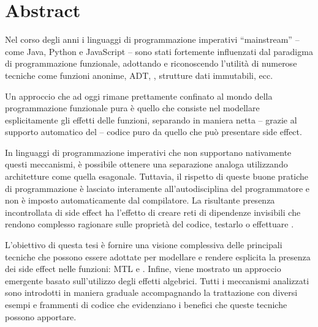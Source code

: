 \chapter*{Abstract}

Nel corso degli anni i linguaggi di programmazione imperativi ``mainstream'' -- come Java, Python e JavaScript -- sono stati fortemente influenzati dal paradigma di programmazione funzionale, adottando e riconoscendo l'utilità di numerose tecniche come funzioni anonime, \ac{ADT}, , strutture dati immutabili, ecc.

Un approccio che ad oggi rimane prettamente confinato al mondo della programmazione funzionale pura è quello che consiste nel modellare esplicitamente gli effetti delle funzioni, separando in maniera netta -- grazie al supporto automatico del  -- codice puro da quello che può presentare side effect.

In linguaggi di programmazione imperativi che non supportano nativamente questi meccanismi, è possibile ottenere una separazione analoga utilizzando architetture come quella esagonale. Tuttavia, il rispetto di queste buone pratiche di programmazione è lasciato interamente all'autodisciplina del programmatore e non è imposto automaticamente dal compilatore.
La risultante presenza incontrollata di side effect ha l'effetto di creare reti di dipendenze invisibili che rendono complesso ragionare sulle proprietà del codice, testarlo o effettuare .

L'obiettivo di questa tesi è fornire una visione complessiva delle principali tecniche che possono essere adottate per modellare e rendere esplicita la presenza dei side effect nelle funzioni: \ac{MTL} e .
Infine, viene mostrato un approccio emergente basato sull'utilizzo degli effetti algebrici.
Tutti i meccanismi analizzati sono introdotti in maniera graduale accompagnando la trattazione con diversi esempi e frammenti di codice che evidenziano i benefici che queste tecniche possono apportare.

